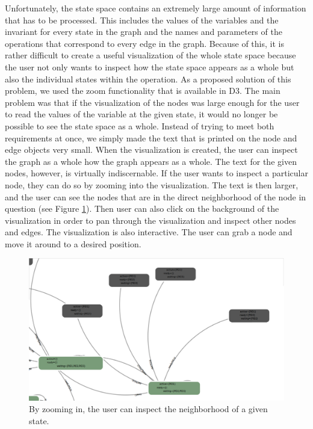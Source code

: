 Unfortunately, the state space contains an extremely large amount of information that has to be processed. This includes the values of the variables and the invariant for every state in the graph and the names and parameters of the operations that correspond to every edge in the graph. Because of this, it is rather difficult to create a useful visualization of the whole state space because the user not only wants to inspect how the state space appears as a whole but also the individual states within the operation. As a proposed solution of this problem, we used the zoom functionality that is available in D3. The main problem was that if the visualization of the nodes was large enough for the user to read the values of the variable at the given state, it would no longer be possible to see the state space as a whole. Instead of trying to meet both requirements at once, we simply made the text that is printed on the node and edge objects very small. When the visualization is created, the user can inspect the graph as a whole how the graph appears as a whole. The text for the given nodes, however, is virtually indiscernable. If the user wants to inspect a particular node, they can do so by zooming into the visualization. The text is then larger, and the user can see the nodes that are in the direct neighborhood of the node in question (see Figure \ref{neighborhood}). Then user can also click on the background of the visualization in order to pan through the visualization and inspect other nodes and edges. The visualization is also interactive. The user can grab a node and move it around to a desired position.

\begin{center}
\begin{figure}[h!]
\includegraphics[width=14cm]{bilder/ss-neighborhood.png}
\caption{By zooming in, the user can inspect the neighborhood of a given state.}
\label{neighborhood}
\end{figure}
\end{center}

